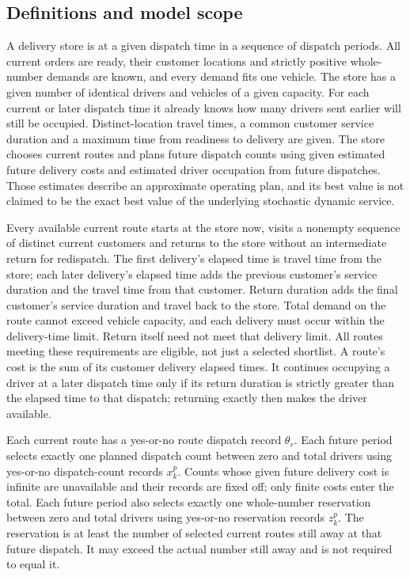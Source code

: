 \documentclass[10pt]{article}
\begin{document}
\subsection*{Definitions and model scope}
A delivery store is at a given dispatch time in a sequence of dispatch periods. All current orders are ready, their customer locations and strictly positive whole-number demands are known, and every demand fits one vehicle. The store has a given number of identical drivers and vehicles of a given capacity. For each current or later dispatch time it already knows how many drivers sent earlier will still be occupied. Distinct-location travel times, a common customer service duration and a maximum time from readiness to delivery are given. The store chooses current routes and plans future dispatch counts using given estimated future delivery costs and estimated driver occupation from future dispatches. Those estimates describe an approximate operating plan, and its best value is not claimed to be the exact best value of the underlying stochastic dynamic service.

Every available current route starts at the store now, visits a nonempty sequence of distinct current customers and returns to the store without an intermediate return for redispatch. The first delivery's elapsed time is travel time from the store; each later delivery's elapsed time adds the previous customer's service duration and the travel time from that customer. Return duration adds the final customer's service duration and travel back to the store. Total demand on the route cannot exceed vehicle capacity, and each delivery must occur within the delivery-time limit. Return itself need not meet that delivery limit. All routes meeting these requirements are eligible, not just a selected shortlist. A route's cost is the sum of its customer delivery elapsed times. It continues occupying a driver at a later dispatch time only if its return duration is strictly greater than the elapsed time to that dispatch; returning exactly then makes the driver available.

Each current route has a yes-or-no route dispatch record $\theta_r$. Each future period selects exactly one planned dispatch count between zero and total drivers using yes-or-no dispatch-count records $x_k^p$. Counts whose given future delivery cost is infinite are unavailable and their records are fixed off; only finite costs enter the total. Each future period also selects exactly one whole-number reservation between zero and total drivers using yes-or-no reservation records $z_k^p$. The reservation is at least the number of selected current routes still away at that future dispatch. It may exceed the actual number still away and is not required to equal it.
\end{document}
